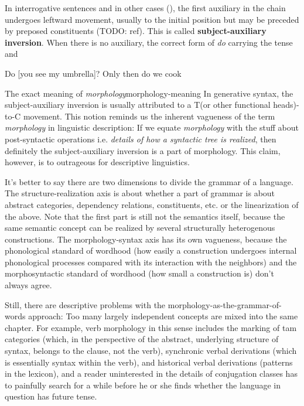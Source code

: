 \documentclass[UTF8, a4paper, oneside, scheme=plain]{ctexrep}
\newcommand*{\concept}[1]{\textbf{#1}}
\newcommand*{\term}[1]{\emph{#1}}
\newcommand{\corpus}[1]{\emph{#1}}
\begin{document}
In interrogative sentences and in other cases (),  
the first auxiliary in the chain undergoes leftward movement,
usually to the initial position but may be preceded by preposed constituents (TODO: ref). 
This is called \concept{subject-auxiliary inversion}.
When there is no auxiliary, 
the correct form of \corpus{do} carrying the tense and 

\begin{exe}
    \ex Do [you see my umbrella]?
    \ex Only then do we cook
\end{exe}

\begin{theorybox}{The exact meaning of \term{morphology}}{morphology-meaning}
    In generative syntax, the subject-auxiliary inversion is usually attributed to 
    a T(or other functional heads)-to-C movement.
    This notion reminds us the inherent vagueness of the term \term{morphology} in linguistic description:
    If we equate \term{morphology} with the stuff about post-syntactic operations 
    i.e. \emph{details of how a syntactic tree is realized},
    then definitely the subject-auxiliary inversion is a part of morphology.
    This claim, however, is to outrageous for descriptive linguistics.

    It's better to say there are two dimensions to divide the grammar of a language.
    The structure-realization axis is about 
    whether a part of grammar is about abstract categories, dependency relations, constituents, etc. 
    or the linearization of the above.
    Note that the first part is still not the semantics itself,
    because the same semantic concept can be realized by several structurally heterogenous constructions.
    The morphology-syntax axis has its own vagueness,
    because the phonological standard of wordhood 
    (how easily a construction undergoes internal phonological processes 
    compared with its interaction with the neighbors)
    and the morphosyntactic standard of wordhood 
    (how small a construction is)
    don't always agree.

    Still, there are descriptive problems with the morphology-as-the-grammar-of-words approach:
    Too many largely independent concepts are mixed into the same chapter.
    For example, verb morphology in this sense includes 
    the marking of \acs{tam} categories 
    (which, in the perspective of the abstract, underlying structure of syntax, 
    belongs to the clause, not the verb),
    synchronic verbal derivations 
    (which is essentially syntax within the verb),
    and historical verbal derivations 
    (patterns in the lexicon),
    and a reader uninterested in the details of conjugation classes 
    has to painfully search for a while before he or she finds 
    whether the language in question has future tense.
\end{theorybox}
\end{document}
